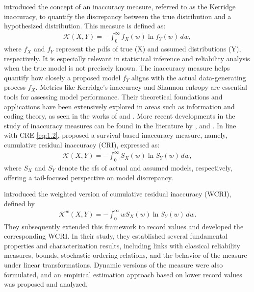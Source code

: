 \documentclass[12pt,a4paper]{article}
\numberwithin{equation}{section}
\begin{document}
\cite{Ker1961} introduced the concept of an inaccuracy measure, referred to as the Kerridge inaccuracy, to quantify the discrepancy between the true distribution and a hypothesized distribution. This measure is defined as:
\begin{align}
	\mathcal{K}(X, Y) = -\int_0^\infty f_X(w) \ln f_Y(w)\,dw,
\end{align}
where $f_X$ and $f_Y$ represent the pdfs of  true (X) and assumed distributions (Y), respectively. It is especially relevant in statistical inference and reliability analysis when the true model is not precisely known. The inaccuracy measure helps quantify how closely a proposed model $f_Y$ aligns with the actual data-generating process $f_X$.
Metrics like Kerridge’s inaccuracy and Shannon entropy are essential tools for assessing model performance. Their theoretical foundations and applications have been extensively explored in areas such as information and coding theory, as seen in the works of \cite{Nat1968} and \cite{Bhat1995}. More recent developments in the study of inaccuracy measures can be found in the literature by \cite{Kun2015}, \cite{Kunb2016} and \cite{Kay2017}. In line with CRE \eqref{eq:1.2}, \cite{Kum2015} proposed a survival-based  inaccuracy measure, namely, cumulative residual inaccuracy (CRI), expressed as:
\begin{align}\label{eq:1.8}
	\mathcal K(X, Y) = -\int_0^{\infty} S_X(w)\ln S_Y(w)\,dw,
\end{align}
where $S_X$ and $S_Y$ denote the sfs of  actual and assumed models, respectively, offering a tail-focused perspective on model discrepancy. 


\cite{Dan2019} introduced the weighted version of cumulative residual inaccuracy (WCRI), defined by
\begin{align}\label{1.8}
    \mathcal{K}^w(X, Y) = -\int_{0}^{\infty}w S_X(w)\ln S_Y(w)\,dw.
\end{align}
They subsequently extended this framework to record values and developed the corresponding WCRI. In their study, they established several fundamental properties and characterization results, including links with classical reliability measures, bounds, stochastic ordering relations, and the behavior of the measure under linear transformations. Dynamic versions of the measure were also formulated, and an empirical estimation approach based on lower record values was proposed and analyzed.
\end{document}
